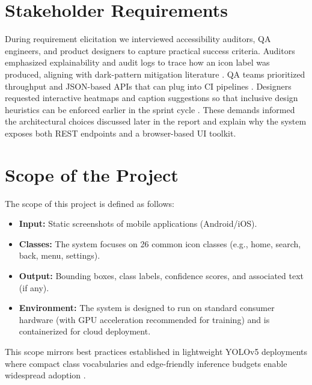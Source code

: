 \documentclass[11pt,a4paper]{report}
\begin{document}
\section{Stakeholder Requirements}
During requirement elicitation we interviewed accessibility auditors, QA engineers, and product designers to capture practical success criteria. Auditors emphasized explainability and audit logs to trace how an icon label was produced, aligning with dark-pattern mitigation literature \cite{darkpatterns}. QA teams prioritized throughput and JSON-based APIs that can plug into CI pipelines \cite{uiautomation}. Designers requested interactive heatmaps and caption suggestions so that inclusive design heuristics can be enforced earlier in the sprint cycle \cite{multimodalaccessibility}. These demands informed the architectural choices discussed later in the report and explain why the system exposes both REST endpoints and a browser-based UI toolkit.

\section{Scope of the Project}
The scope of this project is defined as follows:
\begin{itemize}
    \item \textbf{Input:} Static screenshots of mobile applications (Android/iOS).
    \item \textbf{Classes:} The system focuses on 26 common icon classes (e.g., home, search, back, menu, settings).
    \item \textbf{Output:} Bounding boxes, class labels, confidence scores, and associated text (if any).
    \item \textbf{Environment:} The system is designed to run on standard consumer hardware (with GPU acceleration recommended for training) and is containerized for cloud deployment.
\end{itemize}

This scope mirrors best practices established in lightweight YOLOv5 deployments where compact class vocabularies and edge-friendly inference budgets enable widespread adoption \cite{yolov5}.
\end{document}
